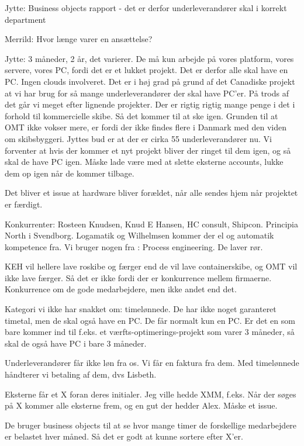 \begin{linenumbers*}
Jytte:
Business objects rapport - det er derfor underleverandører skal i korrekt department

Merrild:
Hvor længe varer en ansættelse?

Jytte:
3 måneder, 2 år, det varierer. De må kun arbejde på vores platform, 
vores servere, vores PC, fordi det er et lukket projekt.
Det er derfor alle skal have en PC. Ingen clouds involveret.
Det er i høj grad på grund af det Canadiske projekt
at vi har brug for så mange underleverandører der skal have PC’er. 
På trods af det går vi meget efter lignende projekter.
Der er rigtig rigtig mange penge i det i forhold til kommercielle skibe.
Så det kommer til at ske igen.
Grunden til at OMT ikke vokser mere, er fordi der ikke findes flere i Danmark
med den viden om skibsbyggeri. 
Jyttes bud er at der er cirka 55 underleverandører nu.
Vi forventer at hvis der kommer et nyt projekt bliver der ringet til dem igen,
og så skal de have PC igen.
Måske lade være med at slette eksterne accounts,
lukke dem op igen når de kommer tilbage.

Det bliver et issue at hardware bliver forældet,
når alle sendes hjem når projektet er færdigt.

Konkurrenter:
Rosteen Knudsen, Knud E Hansen, HC consult, Shipcon. Principia North i Svendborg. 
Logamatik og Wilhelmsen kommer der el og automatik kompetence fra.
Vi bruger nogen fra : Process engineering. De laver rør.

KEH vil hellere lave roskibe og færger end de vil lave containerskibe,
og OMT vil ikke lave færger. Så det er ikke fordi der er konkurrence mellem
firmaerne. 
Konkurrence om de gode medarbejdere, men ikke andet end det.

Kategori vi ikke har snakket om: timelønnede.
De har ikke noget garanteret timetal, men de skal også have en PC.
De får normalt kun en PC. Er det en som bare kommer ind til f.eks.
et værfts-optimerings-projekt som varer 3 måneder,
så skal de også have PC i bare 3 måneder.

Underleverandører får ikke løn fra os. Vi får en faktura fra dem. 
Med timelønnede håndterer vi betaling af dem, dvs Lisbeth.

Eksterne får et X foran deres initialer. Jeg ville hedde XMM, f.eks.
Når der søges på X kommer alle eksterne frem, og en gut der hedder Alex.
Måske et issue.

De bruger business objects til at se hvor mange timer
de forskellige medarbejdere er belastet hver måned.
Så det er godt at kunne sortere efter X’er.
\end{linenumbers*}